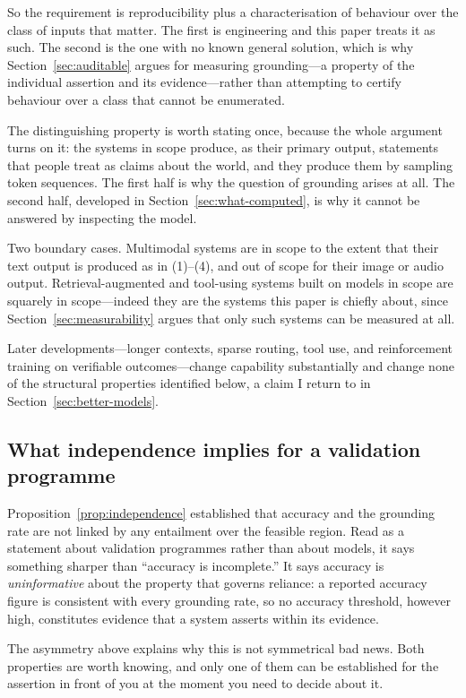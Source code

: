 So the requirement is reproducibility plus a characterisation of behaviour over the
class of inputs that matter. The first is engineering and this paper treats it as
such. The second is the one with no known general solution, which is why
Section~\ref{sec:auditable} argues for measuring grounding---a property of the
individual assertion and its evidence---rather than attempting to certify behaviour
over a class that cannot be enumerated.

The distinguishing property is worth stating once, because the whole argument turns
on it: the systems in scope produce, as their primary output, statements that people
treat as claims about the world, and they produce them by sampling token sequences.
The first half is why the question of grounding arises at all. The second half,
developed in Section~\ref{sec:what-computed}, is why it cannot be answered by
inspecting the model.

Two boundary cases. Multimodal systems are in scope to the extent that their
text output is produced as in (1)--(4), and out of scope for their image or audio
output. Retrieval-augmented and tool-using systems built on models in scope are
squarely in scope---indeed they are the systems this paper is chiefly about, since
Section~\ref{sec:measurability} argues that only such systems can be measured at
all.

Later developments---longer contexts, sparse routing, tool use, and
reinforcement training on verifiable outcomes---change capability substantially and
change none of the structural properties identified below, a claim I return to in
Section~\ref{sec:better-models}.

\subsection{What independence implies for a validation programme}

Proposition~\ref{prop:independence} established that accuracy and the grounding
rate are not linked by any entailment over the feasible region. Read as a statement about
validation programmes rather than about models, it says something sharper than
``accuracy is incomplete.'' It says accuracy is \emph{uninformative} about the
property that governs reliance: a reported accuracy figure is consistent with every
grounding rate, so no accuracy threshold, however high, constitutes evidence that a
system asserts within its evidence.

The asymmetry above explains why this is not symmetrical bad news. Both properties
are worth knowing, and only one of them can be established for the assertion in
front of you at the moment you need to decide about it.

